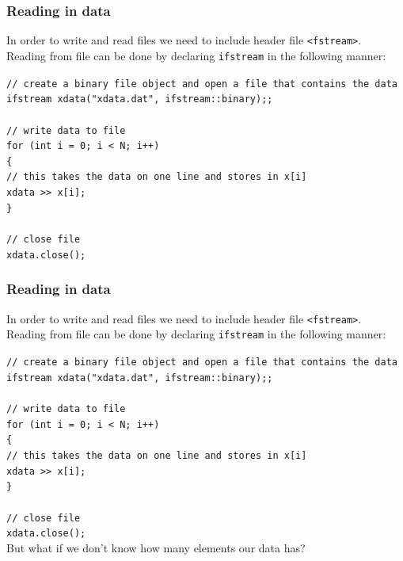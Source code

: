 \documentclass{if-beamer}
\begin{document}
\begin{frame}
	\frametitle{Reading in data}
	In order to write and read files we need to include header file
	\texttt{<fstream>}. \\\vspace{5pt}
	Reading from file can be done by declaring \texttt{ifstream} in the following manner:\\\vspace{10pt}
	
	\texttt{// create a binary file object and open a file that contains the data}\\
	\texttt{ifstream xdata("xdata.dat", ifstream::binary);;}\\
	\texttt{ }\\
	\texttt{// write data to file}\\
	\texttt{for (int i = 0; i < N; i++)}\\
	\texttt{\{}\\
	\texttt{\qquad // this takes the data on one line and stores in x[i]}\\
	\texttt{\qquad xdata >> x[i];}\\
	\texttt{\}}\\
	\texttt{ }\\
	\texttt{// close file}\\
	\texttt{xdata.close();}\\
	
\end{frame}

\begin{frame}
	\frametitle{Reading in data}
	In order to write and read files we need to include header file
	\texttt{<fstream>}. \\\vspace{5pt}
	Reading from file can be done by declaring \texttt{ifstream} in the following manner:\\\vspace{10pt}
	
	\texttt{// create a binary file object and open a file that contains the data}\\
	\texttt{ifstream xdata("xdata.dat", ifstream::binary);;}\\
	\texttt{ }\\
	\texttt{// write data to file}\\
	\texttt{for (int i = 0; i < N; i++)}\\
	\texttt{\{}\\
	\texttt{\qquad // this takes the data on one line and stores in x[i]}\\
	\texttt{\qquad xdata >> x[i];}\\
	\texttt{\}}\\
	\texttt{ }\\
	\texttt{// close file}\\
	\texttt{xdata.close();}\\
	\vspace{10pt}
	But what if we don't know how many elements our data has?
\end{frame}
\end{document}
